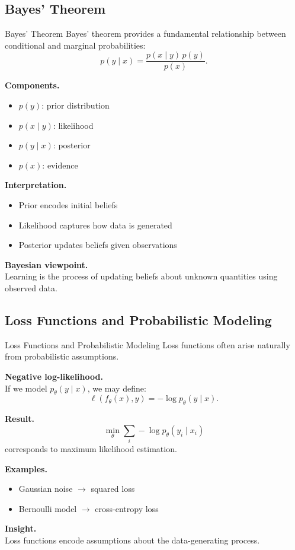 \documentclass[aspectratio=169,11pt]{beamer}
\begin{document}
\subsection{Bayes’ Theorem}
\begin{frame}[t,allowframebreaks]{Bayes’ Theorem}
\small
Bayes’ theorem provides a fundamental relationship between conditional and marginal probabilities:
\[
p(y \mid x) = \frac{p(x \mid y)\, p(y)}{p(x)}.
\]

\textbf{Components.}\\ \begin{itemize}
    \item $p(y)$: prior distribution
    \item $p(x \mid y)$: likelihood
    \item $p(y \mid x)$: posterior
    \item $p(x)$: evidence
\end{itemize}

\textbf{Interpretation.}\\ \begin{itemize}
    \item Prior encodes initial beliefs
    \item Likelihood captures how data is generated
    \item Posterior updates beliefs given observations
\end{itemize}

\textbf{Bayesian viewpoint.}\\ Learning is the process of updating beliefs about unknown quantities using observed data.
\end{frame}

\subsection{Loss Functions and Probabilistic Modeling}
\begin{frame}[t,allowframebreaks]{Loss Functions and Probabilistic Modeling}
\small
Loss functions often arise naturally from probabilistic assumptions.

\textbf{Negative log-likelihood.}\\ If we model $p_\theta(y \mid x)$, we may define:
\[
\ell(f_\theta(x), y) = -\log p_\theta(y \mid x).
\]

\textbf{Result.}\\ \[
\min_\theta \sum_i -\log p_\theta(y_i \mid x_i)
\]
corresponds to maximum likelihood estimation.

\textbf{Examples.}\\ \begin{itemize}
    \item Gaussian noise $\rightarrow$ squared loss
    \item Bernoulli model $\rightarrow$ cross-entropy loss
\end{itemize}

\textbf{Insight.}\\ Loss functions encode assumptions about the data-generating process.
\end{frame}
\end{document}
